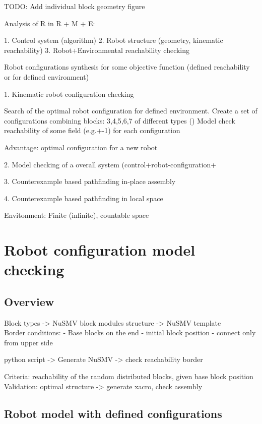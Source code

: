 TODO: Add individual block geometry figure

Analysis of R in R + M + E:

1. Control system (algorithm)
2. Robot structure (geometry, kinematic reachability)
3. Robot+Environmental reachability checking

Robot configurations synthesis for some objective function
(defined reachability or for defined environment)

1. Kinematic robot configuration checking

Search of the optimal robot configuration for defined environment.
Create a set of configurations combining blocks: 3,4,5,6,7 of different types ()
Model check reachability of some field (e.g.+-1) for each configuration

Advantage: optimal configuration for a new robot

2. Model checking of a overall system (control+robot-configuration+

3. Counterexample based pathfinding in-place assembly

4. Counterexample based pathfinding in local space

Envitonment:
Finite (infinite), countable space




\section{Robot configuration model checking}

\subsection{Overview}

Block types -> NuSMV block modules structure -> NuSMV template\\
Border conditions:
    - Base blocks on the end
    - initial block position
    - connect only from upper side

python script -> Generate NuSMV -> check reachability border


Criteria: reachability of the random distributed blocks, given base block position
Validation: 
optimal structure -> generate xacro, check assembly

\subsection{Robot model with defined configurations}

